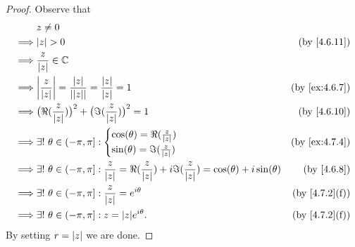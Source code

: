 \begin{proof}
  Observe that
  \begin{align*}
             & z \neq 0                                                                                                                                                               \\
    \implies & \abs{z} > 0                                                                                                                              & \text{(by \cref{4.6.11})}   \\
    \implies & \frac{z}{\abs{z}} \in \C                                                                                                                                               \\
    \implies & \abs{\frac{z}{\abs{z}}} = \frac{\abs{z}}{\abs{\abs{z}}} = \frac{\abs{z}}{\abs{z}} = 1                                                    & \text{(by \cref{ex:4.6.7})} \\
    \implies & \big(\Re(\frac{z}{\abs{z}})\big)^2 + \big(\Im(\frac{z}{\abs{z}})\big)^2 = 1                                                              & \text{(by \cref{4.6.10})}   \\
    \implies & \exists!\ \theta \in (-\pi, \pi] : \begin{cases}
                                                    \cos(\theta) = \Re(\frac{z}{\abs{z}}) \\
                                                    \sin(\theta) = \Im(\frac{z}{\abs{z}})
                                                  \end{cases}                                                                  & \text{(by \cref{ex:4.7.4})}                          \\
    \implies & \exists!\ \theta \in (-\pi, \pi] : \frac{z}{\abs{z}} = \Re(\frac{z}{\abs{z}}) + i \Im(\frac{z}{\abs{z}}) = \cos(\theta) + i \sin(\theta) & \text{(by \cref{4.6.8})}    \\
    \implies & \exists!\ \theta \in (-\pi, \pi] : \frac{z}{\abs{z}} = e^{i \theta}                                                                      & \text{(by \cref{4.7.2}(f))} \\
    \implies & \exists!\ \theta \in (-\pi, \pi] : z = \abs{z} e^{i \theta}.                                                                             & \text{(by \cref{4.7.2}(f))}
  \end{align*}
  By setting \(r = \left\lvert z\right\rvert\) we are done.
\end{proof}

